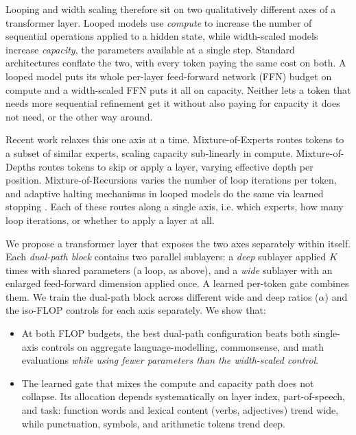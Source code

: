 \documentclass[11pt]{article}
\begin{document}
Looping and width scaling therefore sit on two qualitatively
different axes of a transformer layer. Looped models use \emph{compute} to increase the number of sequential operations applied to a hidden state, while width-scaled models increase \emph{capacity}, the parameters available at a single step. Standard architectures conflate the two, with every token paying the same cost on both. A looped model puts its whole per-layer feed-forward network (FFN) budget on compute and a width-scaled FFN puts it all on capacity. Neither lets a token that needs more sequential refinement get it without also paying for capacity it does not need, or the other way around.

Recent work relaxes this one axis at a time.
Mixture-of-Experts \citep{shazeer-etal-2017-moe,
fedus-etal-2022-switch} routes tokens to a subset of similar
experts, scaling capacity sub-linearly in compute.
Mixture-of-Depths \citep{raposo-etal-2024-mod} routes tokens to
skip or apply a layer, varying effective depth per position.
Mixture-of-Recursions \citep{bae-etal-2025-mor} varies the
number of loop iterations per token, and adaptive halting
mechanisms in looped models do the same via learned stopping \citep{graves-2016-act, banino2021pondernet,
frey-etal-2026-adaptive}. Each of these routes along a single axis, i.e. which experts, how many loop iterations, or whether to apply a layer at all.

We propose a transformer layer that exposes the two axes
separately within itself. Each \emph{dual-path block} contains
two parallel sublayers: a \emph{deep} sublayer applied $K$
times with shared parameters (a loop, as above), and
a \emph{wide} sublayer with an enlarged feed-forward dimension
applied once. A learned per-token gate combines them. We train the dual-path block across different wide and deep ratios ($\alpha$) and the iso-FLOP controls for each axis separately. We show that: 

\begin{itemize}
\item At both FLOP budgets, the best dual-path configuration
beats both single-axis controls on aggregate language-modelling, commonsense, and math evaluations
\emph{while using fewer parameters than the width-scaled
control}.
\item The learned gate that mixes the compute and capacity path does not collapse. Its allocation depends systematically on layer index, part-of-speech, and task: function words and lexical content (verbs, adjectives) trend wide, while punctuation, symbols, and arithmetic tokens trend deep.
\end{itemize}
\end{document}
